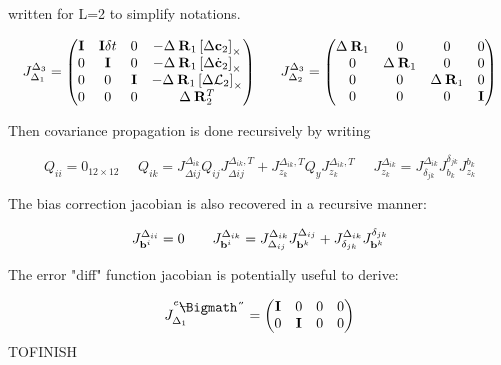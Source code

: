 \documentclass[11pt]{article}
\newcommand{\Rot}[2]{\prescript{#1}{}{\bfR}_{#2}}
\newcommand{\bias}{\bfb}
\newcommand{\AM}{\mathcal{L}}
\newcommand{\COM}{\bfc}
\newcommand{\COMd}{\dot{\bfc}}
\newcommand{\Ident}{\bfI}
\def\diamondminus{\mathrel{%
		\ooalign{$-$\cr\hss\lower.255ex\hbox{\Bigmath\char5}\hss}}}
\begin{document}
written for L=2 to simplify notations.

\begin{equation}
    J^{\Delta_3}_{\Delta_1} =
    \begin{pmatrix}
    \Ident & \Ident \delta t & 0 & - \Delta \Rot{}{1} \left[\Delta \COM_2 \right]_{\times}
    \\
    0 & \Ident & 0 & - \Delta \Rot{}{1} \left[\Delta \COMd_2 \right]_{\times}
    \\
    0 & 0 & \Ident & - \Delta \Rot{}{1} \left[\Delta \AM_2 \right]_{\times}
    \\
    0 & 0 & 0 & \Delta \Rot{}{2}^T
    \end{pmatrix}
    ~~~~~
    J^{\Delta_3}_{\Delta_2} =
    \begin{pmatrix}
    \Delta \Rot{}{1} & 0 & 0 & 0
    \\
    0 & \Delta \Rot{}{1} & 0 & 0
    \\
    0 & 0 & \Delta \Rot{}{1} & 0
    \\
    0 & 0 & 0 & \Ident
    \end{pmatrix}
\end{equation}


Then covariance propagation is done recursively by writing 

\begin{equation}
    Q_{ii} = 0_{12\times 12} ~~~~~~ Q_{ik} = J^{\Delta_{ik}}_{\Delta {ij}} Q_{ij} J^{\Delta_{ik},T}_{\Delta {ij}} + J^{\Delta_{ik},T}_{z_k} Q_y J^{\Delta_{ik},T}_{z_k}  ~~~~~~ J^{\Delta_{ik}}_{z_k} = J^{\Delta_{ik}}_{\delta_{jk}} J^{\delta_{jk}}_{b_k} J^{b_k}_{z_k}
\end{equation}

The bias correction jacobian is also recovered in a recursive manner:

\begin{equation}
    J^{\Delta_{ii}}_{\bias^i} = 0 ~~~~~~  J^{\Delta_{ik}}_{\bias^i} = J^{\Delta_{ik}}_{\Delta_{ij}} J^{\Delta_{ij}}_{\bias^k} + J^{\Delta_{ik}}_{\delta_{jk}} J^{\delta_{jk}}_{\bias^k}
\end{equation}



The error "diff" function jacobian is potentially useful to derive:


\begin{equation}
	J^{e_{\diamondminus}}_{\Delta_1}=
	\begin{pmatrix}
	\Ident & 0 & 0 & 0
	\\
	0 & \Ident & 0 & 0
	\end{pmatrix}
\end{equation}
TOFINISH
\end{document}
